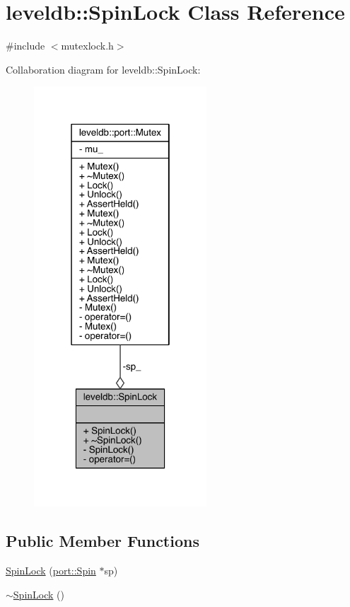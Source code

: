 \hypertarget{classleveldb_1_1_spin_lock}{}\section{leveldb\+:\+:Spin\+Lock Class Reference}
\label{classleveldb_1_1_spin_lock}


{\ttfamily \#include $<$mutexlock.\+h$>$}



Collaboration diagram for leveldb\+:\+:Spin\+Lock\+:\nopagebreak
\begin{figure}[H]
\begin{center}
\leavevmode
\includegraphics[width=183pt]{classleveldb_1_1_spin_lock__coll__graph}
\end{center}
\end{figure}
\subsection*{Public Member Functions}
\begin{DoxyCompactItemize}
\item 
\hyperlink{classleveldb_1_1_spin_lock_a617fd6c329fb630ed3ea8a8cff46826a}{Spin\+Lock} (\hyperlink{namespaceleveldb_1_1port_a3017c82209c2da44f142ef633e012149}{port\+::\+Spin} $\ast$sp)
\item 
\hyperlink{classleveldb_1_1_spin_lock_a7902e500e62779d96eb513cc49e11595}{$\sim$\+Spin\+Lock} ()
\end{DoxyCompactItemize}
